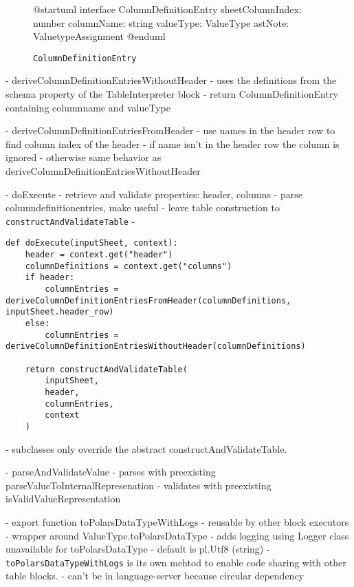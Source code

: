 \begin{figure}
	\begin{plantuml}
		@startuml
		interface ColumnDefinitionEntry {
				sheetColumnIndex: number
				columnName: string
				valueType: ValueType
				astNote: ValuetypeAssignment
			}
		@enduml
	\end{plantuml}
	\caption{\Verb|ColumnDefinitionEntry|}\label{fig:uml:ColumnDefinitionEntry}
\end{figure}


- deriveColumnDefinitionEntriesWithoutHeader
- uses the definitions from the schema property of the TableInterpreter block
- return ColumnDefinitionEntry containing columnname and valueType

- deriveColumnDefinitionEntriesFromHeader
- use names in the header row to find column index of the header
- if name isn't in the header row the column is ignored
- otherwise same behavior as deriveColumnDefinitionEntriesWithoutHeader

- doExecute
- retrieve and validate properties: header, columns
- parse columndefinitionentries, make useful
- leave table construction to \Verb|constructAndValidateTable|
- \begin{listing}
	\begin{verbatim}
def doExecute(inputSheet, context):
	header = context.get("header")
	columnDefinitions = context.get("columns")
	if header:
		columnEntries = deriveColumnDefinitionEntriesFromHeader(columnDefinitions, inputSheet.header_row)
	else:
		columnEntries = deriveColumnDefinitionEntriesWithoutHeader(columnDefinitions)

	return constructAndValidateTable(
		inputSheet,
		header,
		columnEntries,
		context
	)
	\end{verbatim}
	\caption{}
	\label{lst:tableInterpreter:doExecute}
\end{listing}
- subclasses only override the abstract constructAndValidateTable.

- parseAndValidateValue
- parses with preexisting parseValueToInternalRepresenation
- validates with preexisting isValidValueRepresentation

- export function toPolarsDataTypeWithLogs
- reusable by other block executors
- wrapper around ValueType.toPolarsDataType
- adds logging using Logger class unavailable for toPolarsDataType
- default is pl.Utf8 (string)
- \Verb|toPolarsDataTypeWithLogs| is its own mehtod to enable code sharing with other table blocks.
- can't be in language-server because circular dependency

